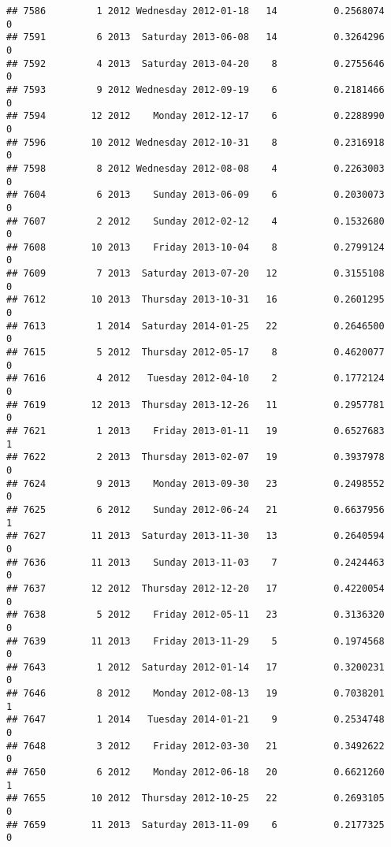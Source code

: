 \documentclass[
]{article}
\begin{document}
\begin{verbatim}
## 7586         1 2012 Wednesday 2012-01-18   14          0.2568074             0
## 7591         6 2013  Saturday 2013-06-08   14          0.3264296             0
## 7592         4 2013  Saturday 2013-04-20    8          0.2755646             0
## 7593         9 2012 Wednesday 2012-09-19    6          0.2181466             0
## 7594        12 2012    Monday 2012-12-17    6          0.2288990             0
## 7596        10 2012 Wednesday 2012-10-31    8          0.2316918             0
## 7598         8 2012 Wednesday 2012-08-08    4          0.2263003             0
## 7604         6 2013    Sunday 2013-06-09    6          0.2030073             0
## 7607         2 2012    Sunday 2012-02-12    4          0.1532680             0
## 7608        10 2013    Friday 2013-10-04    8          0.2799124             0
## 7609         7 2013  Saturday 2013-07-20   12          0.3155108             0
## 7612        10 2013  Thursday 2013-10-31   16          0.2601295             0
## 7613         1 2014  Saturday 2014-01-25   22          0.2646500             0
## 7615         5 2012  Thursday 2012-05-17    8          0.4620077             0
## 7616         4 2012   Tuesday 2012-04-10    2          0.1772124             0
## 7619        12 2013  Thursday 2013-12-26   11          0.2957781             0
## 7621         1 2013    Friday 2013-01-11   19          0.6527683             1
## 7622         2 2013  Thursday 2013-02-07   19          0.3937978             0
## 7624         9 2013    Monday 2013-09-30   23          0.2498552             0
## 7625         6 2012    Sunday 2012-06-24   21          0.6637956             1
## 7627        11 2013  Saturday 2013-11-30   13          0.2640594             0
## 7636        11 2013    Sunday 2013-11-03    7          0.2424463             0
## 7637        12 2012  Thursday 2012-12-20   17          0.4220054             0
## 7638         5 2012    Friday 2012-05-11   23          0.3136320             0
## 7639        11 2013    Friday 2013-11-29    5          0.1974568             0
## 7643         1 2012  Saturday 2012-01-14   17          0.3200231             0
## 7646         8 2012    Monday 2012-08-13   19          0.7038201             1
## 7647         1 2014   Tuesday 2014-01-21    9          0.2534748             0
## 7648         3 2012    Friday 2012-03-30   21          0.3492622             0
## 7650         6 2012    Monday 2012-06-18   20          0.6621260             1
## 7655        10 2012  Thursday 2012-10-25   22          0.2693105             0
## 7659        11 2013  Saturday 2013-11-09    6          0.2177325             0

\end{verbatim}
\end{document}
